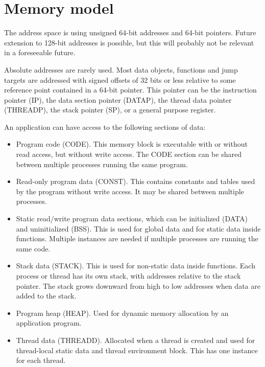 \documentclass[forwardcom.tex]{subfiles}
\begin{document}
\RaggedRight

\chapter{Memory model} \label{memoryModel}
The address space is using unsigned 64-bit addresses and 64-bit pointers. Future extension to 128-bit addresses is possible, but this will probably not be relevant in a foreseeable future. 
\vspace{2mm}

Absolute addresses are rarely used. Most data objects, functions and jump targets are addressed with signed offsets of 32 bits or less relative to some reference point contained in a 64-bit pointer. This pointer can be the instruction pointer (IP), the data section pointer (DATAP), the thread data
pointer (THREADP), the stack pointer (SP), or a general purpose register.
\vspace{2mm}

An application can have access to the following sections of data:
\vspace{2mm}

\begin{itemize}
\item Program code (CODE). This memory block is executable with or without read access, but without write access. The CODE section can be shared between multiple processes running the same program. 

\item Read-only program data (CONST). This contains constants and tables used by the program without write access. It may be shared between multiple processes. 

\item Static read/write program data sections, which can be initialized (DATA) and uninitialized (BSS). This is used for global data and for static data inside functions. Multiple instances are needed if multiple processes are running the same code. 

\item Stack data (STACK). This is used for non-static data inside functions. Each process or thread has its own stack, with addresses relative to the stack pointer. The stack grows downward from high to low addresses when data are added to the stack. 

\item Program heap (HEAP). Used for dynamic memory allocation by an application program. 

\item Thread data (THREADD). Allocated when a thread is created and used for thread-local static data and thread environment block. This has one instance for each thread.
\end{itemize}
\end{document}
